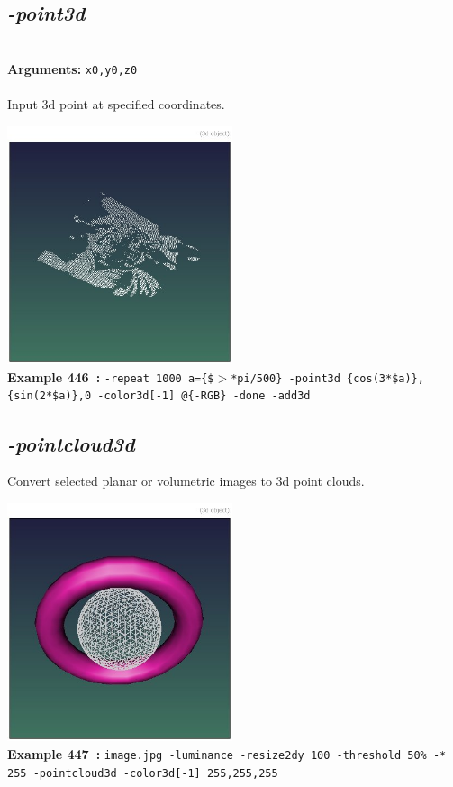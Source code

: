 \documentclass[a4paper,11pt,twoside]{book}
\begin{document}
\subsection{\emph{-point3d} }\vspace*{-0.5em}
~\\\textbf{Arguments: } 
{\small \texttt{x0,y0,z0}}\\~\\
Input 3d point at specified coordinates.
\begin{center}\includegraphics[keepaspectratio=true,height=7cm,width=\textwidth]{img/gmic_def446.jpg}\\
{\footnotesize \textbf{Example 446~:} \texttt{-repeat 1000 a=\{\$$>$*pi/500\} -point3d \{cos(3*\$a)\},\{sin(2*\$a)\},0 -color3d[-1] @\{-RGB\} -done -add3d}}
\end{center}

\subsection{\emph{-pointcloud3d} }\vspace*{-0.5em}
Convert selected planar or volumetric images to 3d point clouds.
\begin{center}\includegraphics[keepaspectratio=true,height=7cm,width=\textwidth]{img/gmic_def447.jpg}\\
{\footnotesize \textbf{Example 447~:} \texttt{image.jpg -luminance -resize2dy 100 -threshold 50\% -* 255 -pointcloud3d -color3d[-1] 255,255,255}}
\end{center}
\end{document}

